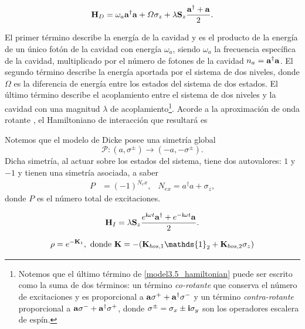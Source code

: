 \documentclass{report} %
\numberwithin{equation}{section}
\begin{document}
\begin{equation}
    \mathbf{H}_D = \omega_a {\bf a}^{\dagger}{\bf a} + \Omega \sigma_z + \lambda {\bf S}_z \frac{{\bf a}^{\dagger}+{\bf a}}{2}.
    \label{model3.5_hamiltonian}
\end{equation}

El primer término describe la energía de la cavidad y es el producto de la energía de un único fotón de la cavidad con energía $\omega_a$, siendo $\omega_a$ la frecuencia específica de la cavidad, multiplicado por el número de fotones de la cavidad $n_a = {\bf a}^{\dagger}{\bf a}$. El segundo término describe la energía aportada por el sistema de dos niveles, donde $\Omega$ es la diferencia de energía entre los estados del sistema de dos estados. El último término describe el acoplamiento entre el sistema de dos niveles y la cavidad con una magnitud $\lambda$ de acoplamiento\footnote{
Notemos que el último término de \eqref{model3.5_hamiltonian} puede ser escrito como la suma de dos términos: un término \textit{co-rotante} que conserva el número de excitaciones y es proporcional a ${\bf a}\sigma^{+} + {\bf a}^{\dagger}\sigma^{-}$ y un término \textit{contra-rotante} proporcional a ${\bf a}\sigma^{-} + {\bf a}^{\dagger}\sigma^{+}$, donde $\sigma^{\pm}=\sigma_{x}\pm {\bf i}\sigma_{y}$ son los operadores escalera de espín.}.
 Acorde a la aproximación de onda rotante \cite{Nielsen.00}, el Hamiltoniano de interacción que resultará es
 
\begin{Omitir}
Notemos que el modelo de Dicke posee una simetría global 
\begin{equation}
    \mathcal{P}: (a,\sigma^{\pm})\rightarrow (-a,-\sigma^{\pm}).
\end{equation}
Dicha simetría, al actuar sobre los estados del sistema, tiene dos autovalores: $1$ y $-1$ y tienen una simetría asociada, a saber 
\begin{align}
    P & = (-1)^{N_ex}, & N_{ex} = a^{\dagger}a + \sigma_z,
\end{align}
donde $P$ es el número total de excitaciones. 
\end{Omitir}

\begin{equation}
    \mathbf{H}_I = \lambda {\bf S}_z\frac{e^{{\bf i}\omega t}{\bf a}^{\dagger}+e^{-{\bf i}\omega t}{\bf a}}{2}.
    \label{model3.5_interaction}
\end{equation}

\begin{equation}
    \rho = e^{-\mathbf{K}_1}, \textnormal{ donde } \mathbf{K} = -(\mathbf{K}_{bos,1} \mathds{1}_2 + \mathbf{K}_{bos,2}\sigma_z) 
    \label{model3.5_rho}
\end{equation}
\end{document}
